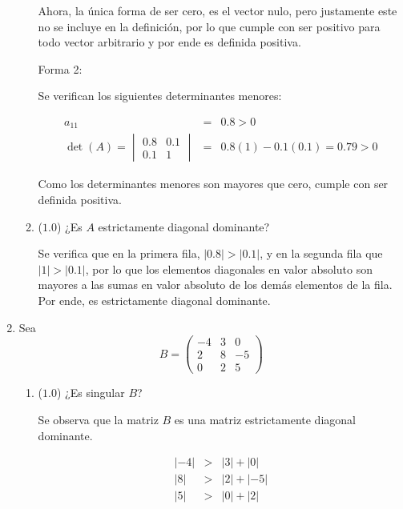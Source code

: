 \documentclass[12pt]{article}
\begin{document}
\begin{enumerate}[leftmargin=*,widest=9]
\begin{enumerate}[label=\alph*]
    Ahora, la única forma de ser cero, es el vector nulo, pero justamente este no se incluye en la definición, por lo que cumple con ser positivo para todo vector arbitrario y por ende es definida positiva.
    
    Forma 2:
    
    Se verifican los siguientes determinantes menores:
    
   \begin{eqnarray*}
   a_{11} &=& 0.8 > 0 \\
   \det(A) = \begin{vmatrix}
    0.8 & 0.1\\ 0.1 & 1
    \end{vmatrix} & = & 0.8(1) -0.1(0.1) = 0.79 > 0 
   \end{eqnarray*}
   
   Como los determinantes menores son mayores que cero, cumple con ser definida positiva.

    \item (\(1.0\)) ¿Es \(A\) estrictamente diagonal dominante?
    
Se verifica que en la primera fila, \(|0.8| > |0.1|\), y en la segunda fila que \(|1| > |0.1|\), por lo que los elementos diagonales en valor absoluto son mayores a las sumas en valor absoluto de los demás elementos de la fila. Por ende, es estrictamente diagonal dominante.
    \end{enumerate}

    \item Sea
    \[
    B = \begin{pmatrix}
    -4 & 3 & 0\\ 2 & 8 & -5\\ 0 & 2 & 5
    \end{pmatrix}
    \] 
    
    \begin{enumerate}[label=\alph*]
    \item (\(1.0\)) ¿Es singular \(B\)?
    
    Se observa que la matriz \(B\) es una matriz estrictamente diagonal dominante.
    
    \begin{eqnarray*}
    |-4| & > & |3|+|0|\\
    |8| & > & |2|+|-5|\\
    |5| & > & |0|+|2|
    \end{eqnarray*}
    

\end{enumerate}
\end{enumerate}
\end{document}
